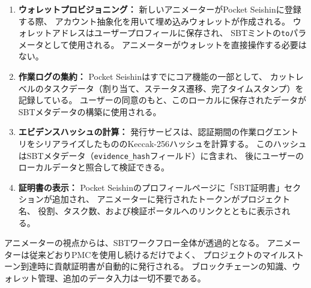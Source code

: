 \begin{enumerate}
  \item \textbf{ウォレットプロビジョニング：}
    新しいアニメーターがPocket Seishinに登録する際、
    アカウント抽象化を用いて埋め込みウォレットが作成される。
    ウォレットアドレスはユーザープロフィールに保存され、
    SBTミントの\texttt{to}パラメータとして使用される。
    アニメーターがウォレットを直接操作する必要はない。
  \item \textbf{作業ログの集約：}
    Pocket Seishinはすでにコア機能の一部として、
    カットレベルのタスクデータ（割り当て、ステータス遷移、完了タイムスタンプ）を
    記録している。
    ユーザーの同意のもと、このローカルに保存されたデータが
    SBTメタデータの構築に使用される。
  \item \textbf{エビデンスハッシュの計算：}
    発行サービスは、認証期間の作業ログエントリをシリアライズしたもののKeccak-256ハッシュを計算する。
    このハッシュはSBTメタデータ（\texttt{evidence\_hash}フィールド）に含まれ、
    後にユーザーのローカルデータと照合して検証できる。
  \item \textbf{証明書の表示：}
    Pocket Seishinのプロフィールページに「SBT証明書」セクションが追加され、
    アニメーターに発行されたトークンがプロジェクト名、
    役割、タスク数、および検証ポータルへのリンクとともに表示される。
\end{enumerate}

アニメーターの視点からは、SBTワークフロー全体が透過的となる。
アニメーターは従来どおりPMCを使用し続けるだけでよく、
プロジェクトのマイルストーン到達時に貢献証明書が自動的に発行される。
ブロックチェーンの知識、ウォレット管理、追加のデータ入力は一切不要である。
